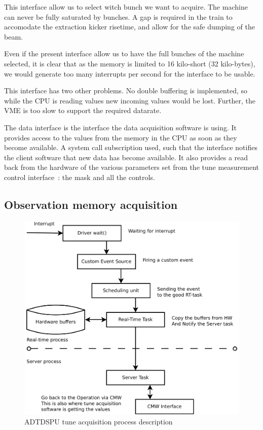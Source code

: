 This interface allow us to select witch bunch we want to acquire. The
machine can never be fully saturated by bunches. A gap is required in
the train to accomodate the extraction kicker risetime, and allow for
the safe dumping of the beam.

Even if the present interface allow us to have the full bunches of the
machine selected, it is clear that as the memory is limited to 16
kilo-short (32 kilo-bytes), we would generate too many interrupts per
second for the interface to be usable.

This interface has two other problems. No double buffering is
implemented, so while the \gls{CPU} is reading values new incoming
values would be lost. Further, the \gls{VME} is too slow to support
the required datarate.

The data interface is the interface the data acquisition software is
using. It provides access to the values from the memory in the
\gls{CPU} as soon as they become available. A system call subscription
used, such that the interface notifies the client software that new
data has become available. It also provides a read back from the
hardware of the various parameters set from the tune measurement
control interface~: the mask and all the controls.

\subsection{Observation memory acquisition}
\label{sec:obs_mem_acq}

\begin{figure}[H]
\caption{ADTDSPU tune acquisition process description}
\centering
\includegraphics[scale=0.3]{adtdspu_acq.pdf}
\end{figure}

